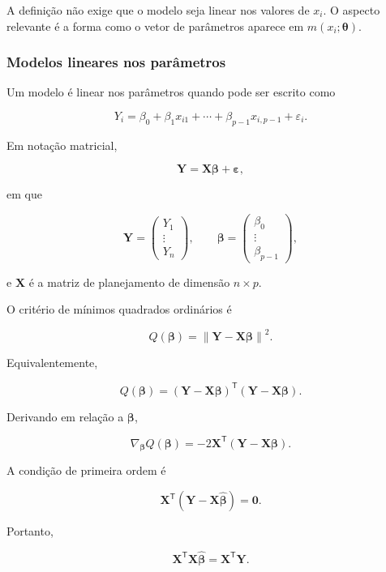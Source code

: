 \documentclass[
  letterpaper,
  DIV=11,
  numbers=noendperiod]{scrreprt}
\begin{document}
A definição não exige que o modelo seja linear nos valores de \(x_i\). O
aspecto relevante é a forma como o vetor de parâmetros aparece em
\(m(x_i;\boldsymbol\theta)\).

\subsubsection{Modelos lineares nos
parâmetros}\label{modelos-lineares-nos-paruxe2metros}

Um modelo é linear nos parâmetros quando pode ser escrito como

\[Y_i
=
\beta_0
+
\beta_1x_{i1}
+
\cdots
+
\beta_{p-1}x_{i,p-1}
+
\varepsilon_i.\]

Em notação matricial,

\[\mathbf{Y}
=
\mathbf{X}\boldsymbol\beta
+
\boldsymbol\varepsilon,\]

em que

\[\mathbf{Y}
=
\begin{pmatrix}
Y_1\\
\vdots\\
Y_n
\end{pmatrix},
\qquad
\boldsymbol\beta
=
\begin{pmatrix}
\beta_0\\
\vdots\\
\beta_{p-1}
\end{pmatrix},\]

e \(\mathbf{X}\) é a matriz de planejamento de dimensão \(n\times p\).

O critério de mínimos quadrados ordinários é

\[Q(\boldsymbol\beta)
=
\left\|
\mathbf{Y}-\mathbf{X}\boldsymbol\beta
\right\|^2.\]

Equivalentemente,

\[Q(\boldsymbol\beta)
=
(\mathbf{Y}-\mathbf{X}\boldsymbol\beta)^\mathsf{T}
(\mathbf{Y}-\mathbf{X}\boldsymbol\beta).\]

Derivando em relação a \(\boldsymbol\beta\),

\[\nabla_{\boldsymbol\beta}
Q(\boldsymbol\beta)
=
-2\mathbf{X}^\mathsf{T}
(\mathbf{Y}-\mathbf{X}\boldsymbol\beta).\]

A condição de primeira ordem é

\[\mathbf{X}^\mathsf{T}
(\mathbf{Y}-\mathbf{X}\widehat{\boldsymbol\beta})
=
\mathbf{0}.\]

Portanto,

\[\mathbf{X}^\mathsf{T}\mathbf{X}
\widehat{\boldsymbol\beta}
=
\mathbf{X}^\mathsf{T}\mathbf{Y}.\]
\end{document}
